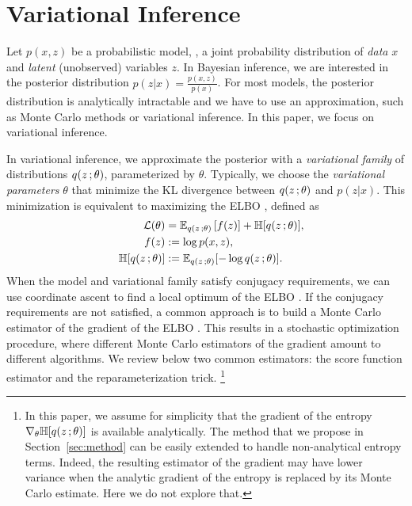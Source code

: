 
\section{Variational Inference}\label{sec:background}
Let $p(x,z)$ be a probabilistic model, \ie, a joint probability distribution of \emph{data} $x$ and \emph{latent} (unobserved) variables $z$. In Bayesian inference, we are interested in the posterior distribution $p(z|x) = \frac{p(x,z)}{p(x)}$. For most models, the posterior distribution is analytically intractable and we have to use an approximation, such as Monte Carlo methods or variational inference. In this paper, we focus on variational inference.%

In variational inference, we approximate the posterior with a \emph{variational family} of distributions $q(z\, ;\theta)$, parameterized by $\theta$. Typically, we choose the \emph{variational parameters} $\theta$ that minimize the \gls{KL} divergence between $q(z\, ;\theta)$ and $p(z | x)$. This minimization is equivalent to maximizing the \gls{ELBO} \citep{Jordan1999}, defined as
\begin{align}
\begin{split}
\mathcal{L}(\theta) &= \mathbb{E}_{q(z\, ; \theta)}\left[f(z)\right] + \mathbb{H}[q(z\, ; \theta)],\\
f(z) & := \log p(x,z), \\
\quad\mathbb{H}[q(z\, ; \theta)] & := \mathbb{E}_{q(z\, ; \theta)}[- \log q(z\, ; \theta)].
\end{split}\label{eq:elbo}
\end{align}
When the model and variational family satisfy conjugacy requirements, we can use coordinate ascent to find a local optimum of the \gls{ELBO} \citep{BleiAlp2016}. If the conjugacy requirements are not satisfied, a common approach is to build a Monte Carlo estimator of the gradient of the \gls{ELBO} \citep{Paisley2012,Ranganath2014,Mnih2014,Salimans2013,Kingma2014}. This results in a stochastic optimization procedure, where different Monte Carlo estimators of the gradient amount to different algorithms. We review below two common estimators: the score function estimator and the reparameterization trick.%
\footnote{In this paper, we assume for simplicity that the gradient of the entropy $\nabla_\theta \mathbb{H}[q(z\, ; \theta)]$ is available analytically. The method that we propose in Section~\ref{sec:method} can be easily extended to handle non-analytical entropy terms. Indeed, the resulting estimator of the gradient may have lower variance when the analytic gradient of the entropy is replaced by its Monte Carlo estimate. Here we do not explore that.}

